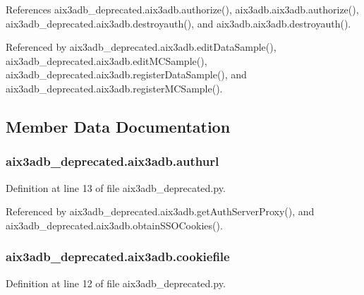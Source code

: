 References aix3adb\-\_\-deprecated.\-aix3adb.\-authorize(), aix3adb.\-aix3adb.\-authorize(), aix3adb\-\_\-deprecated.\-aix3adb.\-destroyauth(), and aix3adb.\-aix3adb.\-destroyauth().



Referenced by aix3adb\-\_\-deprecated.\-aix3adb.\-edit\-Data\-Sample(), aix3adb\-\_\-deprecated.\-aix3adb.\-edit\-M\-C\-Sample(), aix3adb\-\_\-deprecated.\-aix3adb.\-register\-Data\-Sample(), and aix3adb\-\_\-deprecated.\-aix3adb.\-register\-M\-C\-Sample().



\subsection{Member Data Documentation}
\subsubsection[{authurl}]{\setlength{\rightskip}{0pt plus 5cm}aix3adb\-\_\-deprecated.\-aix3adb.\-authurl\hspace{0.3cm}{\ttfamily [inherited]}}\label{classaix3adb__deprecated_1_1aix3adb_a209888746b3f38a2eb924850a36fa81e}


Definition at line 13 of file aix3adb\-\_\-deprecated.\-py.



Referenced by aix3adb\-\_\-deprecated.\-aix3adb.\-get\-Auth\-Server\-Proxy(), and aix3adb\-\_\-deprecated.\-aix3adb.\-obtain\-S\-S\-O\-Cookies().

\subsubsection[{cookiefile}]{\setlength{\rightskip}{0pt plus 5cm}aix3adb\-\_\-deprecated.\-aix3adb.\-cookiefile\hspace{0.3cm}{\ttfamily [inherited]}}\label{classaix3adb__deprecated_1_1aix3adb_af033ccecd5302312bf229a940130681c}


Definition at line 12 of file aix3adb\-\_\-deprecated.\-py.



